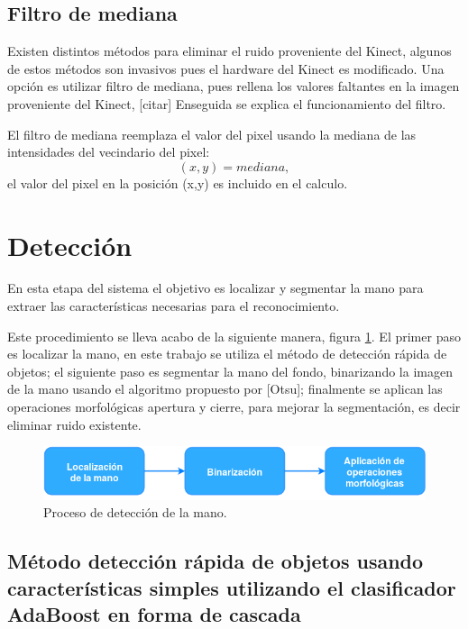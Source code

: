 \subsection{Filtro de mediana} 

Existen distintos métodos para eliminar el ruido proveniente del Kinect, algunos de estos métodos son invasivos pues el hardware del Kinect es modificado. Una opción es utilizar filtro de mediana, pues rellena los valores faltantes en la imagen proveniente del Kinect, [citar] Enseguida se explica el funcionamiento del filtro. 

El filtro de mediana reemplaza el valor del pixel usando la mediana de las intensidades del vecindario del pixel: 
$$(x,y)=mediana,$$
el valor del pixel en la posición (x,y) es incluido en el calculo. 
 



\section{Detección}\label{sec:Detection}

En esta etapa del sistema el objetivo es localizar y segmentar la mano para extraer las características necesarias para el reconocimiento.

Este procedimiento se lleva acabo de la siguiente manera, figura  \ref{fig:ProcesoDeteccion}. El primer paso es localizar la mano, en este trabajo se utiliza el método de detección rápida de objetos; el siguiente paso es segmentar la mano del fondo, binarizando la imagen de la mano usando el algoritmo propuesto por [Otsu]; finalmente se aplican las operaciones morfológicas apertura y cierre, para mejorar la segmentación, es decir eliminar ruido existente. 

\begin{figure}[h!]
\begin{center}
\includegraphics[scale=.7]{./Figures/Detection.png}
\end{center}
\caption{Proceso de detección de la mano.}
\label{fig:ProcesoDeteccion}
\end{figure} 

\subsection{Método detección rápida de objetos usando características simples utilizando el clasificador AdaBoost en forma de cascada}\label{subsec:ViolaJones}

